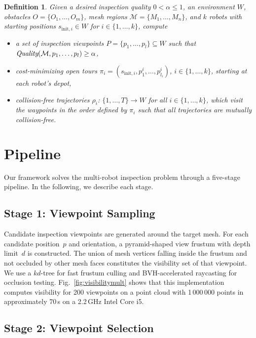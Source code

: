 \documentclass[letterpaper, 10 pt, conference]{ieeeconf}  %
\newtheorem{definition}{Definition}
\begin{document}
\begin{definition}
Given a desired inspection quality $0 < \alpha \le 1$, an environment $W$, obstacles $O = \{O_1,\ldots, O_m\}$, mesh regions
$\mathcal{M} = \{M_1,\ldots, M_n \}$, and $k$ robots with starting positions $s_{\text{init},i} \in W$ for $i\in \{1,\ldots,k\}$, compute
\begin{itemize}
\item a set of inspection viewpoints 
$P = \{p_1 ,\ldots,p_l\} \subseteq W$ such that
$\mbox{\em Quality}(\mathcal{M}, p_1 ,\ldots,p_l) \ge \alpha$,
\item cost-minimizing open tours $\pi_i = (s_{\text{init},i}, p^i_1 ,\ldots,p^i_{l_i})$, $i\in \{1,\ldots,k\}$, starting at each robot's depot,
\item collision-free trajectories $\rho_i$:
$\{1,\ldots,T\} \rightarrow W$ for all $i\in \{1,\ldots,k\}$, which visit the waypoints
in the order defined by $\pi_i$ such that all trajectories are mutually collision-free.
\end{itemize}
\end{definition}

\section{Pipeline}

Our framework solves the multi-robot inspection problem through a five-stage pipeline. In the following, we describe each stage.

\subsection{Stage 1: Viewpoint Sampling}

Candidate inspection viewpoints are generated around the target mesh. For each candidate position~$p$ and orientation, a pyramid-shaped view frustum with depth limit~$d$ is constructed. The union of mesh vertices falling inside the frustum and not occluded by other mesh faces constitutes the visibility set of that viewpoint. We use a $kd$-tree for fast frustum culling and BVH-accelerated raycasting for occlusion testing. Fig.~\ref{fig:visibilitymult} shows that this implementation computes visibility for 200 viewpoints on a point cloud with 1\,000\,000 points in approximately 70\,s on a 2.2\,GHz Intel Core i5.

\subsection{Stage 2: Viewpoint Selection}
\end{document}
